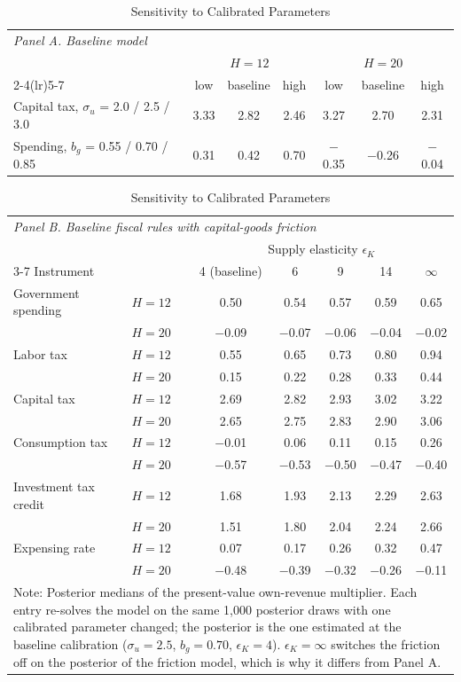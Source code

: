 \begin{table}[ht]
\centering
\caption{Sensitivity to Calibrated Parameters}
\label{tab:sens}
\begin{tabular}{lcccccc}
\hline\hline
\multicolumn{7}{l}{\textit{Panel A. Baseline model}} \\
 & \multicolumn{3}{c}{$H=12$} & \multicolumn{3}{c}{$H=20$} \\
\cmidrule(lr){2-4}\cmidrule(lr){5-7}
 & low & baseline & high & low & baseline & high \\
\hline
Capital tax, $\sigma_u$ = 2.0 / 2.5 / 3.0 & 3.33 & 2.82 & 2.46 & 3.27 & 2.70 & 2.31 \\
Spending, $b_g$ = 0.55 / 0.70 / 0.85 & 0.31 & 0.42 & 0.70 & $-$0.35 & $-$0.26 & $-$0.04 \\
\hline\hline
\end{tabular}

\vspace{1em}

\begin{tabular}{llccccc}
\hline\hline
\multicolumn{7}{l}{\textit{Panel B. Baseline fiscal rules with capital-goods friction}} \\
 & & \multicolumn{5}{c}{Supply elasticity $\epsilon_K$} \\
\cmidrule(lr){3-7}
Instrument & & 4 (baseline) & 6 & 9 & 14 & $\infty$ \\
\hline
Government spending & $H=12$ & 0.50 & 0.54 & 0.57 & 0.59 & 0.65 \\
 & $H=20$ & $-$0.09 & $-$0.07 & $-$0.06 & $-$0.04 & $-$0.02 \\
Labor tax & $H=12$ & 0.55 & 0.65 & 0.73 & 0.80 & 0.94 \\
 & $H=20$ & 0.15 & 0.22 & 0.28 & 0.33 & 0.44 \\
Capital tax & $H=12$ & 2.69 & 2.82 & 2.93 & 3.02 & 3.22 \\
 & $H=20$ & 2.65 & 2.75 & 2.83 & 2.90 & 3.06 \\
Consumption tax & $H=12$ & $-$0.01 & 0.06 & 0.11 & 0.15 & 0.26 \\
 & $H=20$ & $-$0.57 & $-$0.53 & $-$0.50 & $-$0.47 & $-$0.40 \\
Investment tax credit & $H=12$ & 1.68 & 1.93 & 2.13 & 2.29 & 2.63 \\
 & $H=20$ & 1.51 & 1.80 & 2.04 & 2.24 & 2.66 \\
Expensing rate & $H=12$ & 0.07 & 0.17 & 0.26 & 0.32 & 0.47 \\
 & $H=20$ & $-$0.48 & $-$0.39 & $-$0.32 & $-$0.26 & $-$0.11 \\
\hline\hline
\multicolumn{7}{p{0.85\textwidth}}{\footnotesize Note: Posterior medians of the present-value own-revenue multiplier. Each entry re-solves the model on the same 1{,}000 posterior draws with one calibrated parameter changed; the posterior is the one estimated at the baseline calibration ($\sigma_u = 2.5$, $b_g = 0.70$, $\epsilon_K = 4$). $\epsilon_K = \infty$ switches the friction off on the posterior of the friction model, which is why it differs from Panel A.}
\end{tabular}
\end{table}
